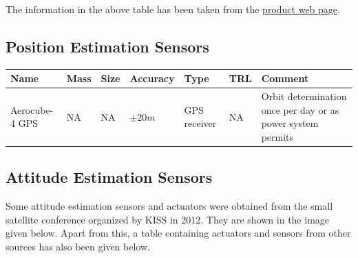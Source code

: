 
The information in the above table has been taken from the \href{http://www.analog.com/static/imported-files/selection_tables/MEMS_Inertial_Sensors_Selection_Tables.pdf}{product web page}.

\subsection{Position Estimation Sensors}
\begin{center}

     \begin{tabular}{ |p{2cm} | p{1cm} | p{2cm} | l | l | l | p{5cm} |}
     \hline

      {\bf Name} & {\bf Mass} & {\bf Size} & {\bf Accuracy} & {\bf Type} & {\bf TRL} & {\bf Comment}  \\ \hline

     Aerocube-4 GPS \cite{Gangestad} & NA & NA &  {$ \pm 20 m $} & GPS receiver & NA & Orbit determination once per day or as power system permits \\ \hline
   
     \end{tabular}
\end{center}

\subsection{Attitude Estimation Sensors}
Some attitude estimation sensors and actuators were obtained from the small satellite conference organized by KISS in 2012. They are shown in the image given below.  Apart from this, a table containing actuators and sensors from other sources has also been given below. 

